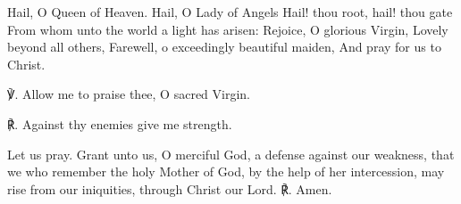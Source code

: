 \begin{otherlanguage}{english}\noindent Hail, O Queen of Heaven.
Hail, O Lady of Angels
Hail! thou root, hail! thou gate
From whom unto the world a light has arisen:
Rejoice, O glorious Virgin,
Lovely beyond all others,
Farewell, o exceedingly beautiful maiden,
And pray for us to Christ.

\noindent ℣. Allow me to praise thee, O sacred Virgin.

\noindent ℟. Against thy enemies give me strength.

\noindent Let us pray. Grant unto us, O merciful God, a defense against our weakness, that we who remember the holy Mother of God, by the help of her intercession, may rise from our iniquities, through Christ our Lord. ℟. Amen.
\end{otherlanguage}